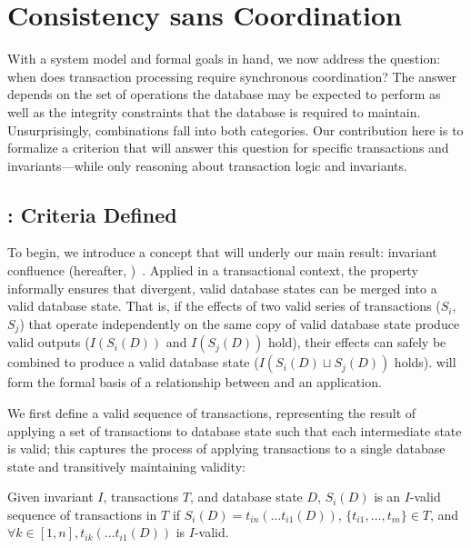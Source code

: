 
\section{Consistency sans Coordination}
\label{sec:bcc-theory}

With a system model and formal goals in hand, we now address the
question: when does transaction processing require synchronous
coordination? The answer depends on the set of operations the database
may be expected to perform as well as the integrity constraints that
the database is required to maintain. Unsurprisingly, combinations
fall into both categories. Our contribution here is to formalize a
criterion that will answer this question for specific transactions and
invariants---while only reasoning about transaction logic and
invariants.

\subsection{\iconfluence: Criteria Defined}

To begin, we introduce a concept that will underly our main result:
invariant confluence (hereafter,
\iconfluence)~\cite{obs-confluence}. Applied in a transactional
context, the \iconfluence property informally ensures that divergent,
valid database states can be merged into a valid database state. That
is, if the effects of two valid series of transactions ($S_i$, $S_j$)
that operate independently on the same copy of valid database state
produce valid outputs ($I(S_i(D))$ and $I(S_j(D))$ hold), their
effects can safely be combined to produce a valid database state
($I(S_i(D) \sqcup S_j(D))$ holds). \iconfluence will form the formal
basis of a relationship between \cfreedom and an application.

We first define a valid sequence of transactions, representing the
result of applying a set of transactions to database state such that
each intermediate state is valid; this captures the process of
applying transactions to a single database state and transitively
maintaining validity:

\begin{definition}
Given invariant $I$, transactions $T$, and database state $D$,
$S_i(D)$ is an $I$-valid sequence of transactions in $T$ if $S_i(D) =
t_{in}(\dots t_{i1}(D))$, $\{t_{i1}, \dots, t_{in}\} \in T$, and
$\forall k \in [1, n], t_{ik}(\dots t_{i1}(D))$ is $I$-valid.
\end{definition}

